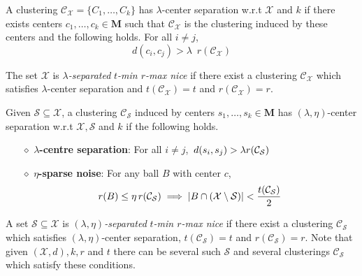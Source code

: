 \documentclass[anon,12pt]{colt2016} %
\newcommand{\mc}{\mathcal}
\newcommand{\mb}{\mathbf}
\begin{document}
\begin{definition}
\label{defn:lambdacs}
A clustering $\mc C_{\mc X} = \{C_1, \ldots, C_k\}$ has $\lambda$-center separation w.r.t $\mc X$ and $k$ if there exists centers $c_1, \ldots, c_k \in \mb M$ such that $\mc C_{\mc X}$ is the clustering induced by these centers and the following holds. For all $i\neq j$, 
$$d(c_i, c_j) > \lambda \enspace r(\mc{C}_{\mc{X}})$$
\end{definition}

\noindent The set $\mc X$ is {\it $\lambda$-separated} {\it $t$-min $r$-max nice} if there exist a clustering $\mc C_{\mc X}$ which satisfies $\lambda$-center separation and $t(\mc{C}_{\mc{X}}) = t$ and $r(\mc{C}_\mc{X}) = r$.

\begin{definition}[$(\lambda, \eta)$-center separation]
Given $\mc S \subseteq \mc X$, a clustering $\mc C_{\mc S}$ induced by centers $s_1, \ldots, s_k \in \mb M$ has $(\lambda, \eta)$-center separation w.r.t $\mc X, \mc S$ and $k$ if the following holds.

\begin{itemize}[nolistsep, noitemsep]
\label{defn:lambdacsnoise}	

\item[$\diamond$] {\bf $\lambda$-centre separation}: For all $i\neq j$, $\thinspace d(s_i, s_j) > \lambda r({\mc C}_{\mc S})$
\item[$\diamond$]{\bf $\eta$-sparse noise}: For any ball $B$ with center $c$, 
\vspace{-0.1in}\begin{align*}
r(B)\leq \eta \thinspace r(\mc{C}_{\mc S}) \implies |B\cap (\mc X\setminus \mc S)| < \frac{t(\mc C_{\mc S})}{2}
\end{align*}
\end{itemize}
\end{definition}

\noindent A set $\mc S \subseteq \mc X$ is {\it $(\lambda, \eta)$-separated} {\it $t$-min $r$-max nice} if there exist a clustering $\mc C_{\mc S}$ which satisfies $(\lambda, \eta)$-center separation,  $t({\mc C}_{\mc S}) = t$ and $r({\mc C}_{\mc S}) = r$. Note that given $(\mc X, d), k, r$ and $t$ there can be several such $\mc S$ and several clusterings $\mc C_{\mc S}$ which satisfy these conditions.
\end{document}
